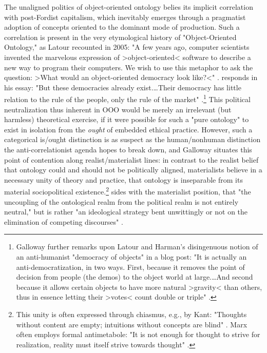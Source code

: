 The unaligned politics of object-oriented ontology belies its implicit correlation with post-Fordist capitalism, which inevitably emerges through a pragmatist adoption of concepts oriented to the dominant mode of production. Such a correlation is present in the very etymological history of "Object-Oriented Ontology," as Latour recounted in 2005: "A few years ago, computer scientists invented the marvelous expression of >object-oriented< software to describe a new way to program their computers. We wish to use this metaphor to ask the question: >What would an object-oriented democracy look like?<" \autocite[14--5]{Latour2005-vc}. \citeauthor{Galloway2013-ht} responds in his essay: "But these democracies already exist.…Their democracy has little relation to the rule of the people, only the rule of the market" \autocite[363]{Galloway2013-ht}.\footnote{
   Galloway further remarks upon Latour and Harman's disingenuous notion of an anti-humanist "democracy of objects" in a blog post: "It is actually an anti-democratization, in two ways. First, because it removes the point of decision from people (the demos) to the object world at large.…And second because it allows certain objects to have more natural >gravity< than others, thus in essence letting their >votes< count double or triple" \autocite{Galloway2012-da}.
  }
This political neutralization thus inherent in OOO would be merely an irrelevant (but harmless) theoretical exercise, if it were possible for such a "pure ontology" to exist in isolation from the \emph{ought} of embedded ethical practice. However, such a categorical is/ought distinction is as suspect as the human/nonhuman distinction the anti-correlationist agenda hopes to break down, and Galloway situates this point of contention along realist/materialist lines: in contrast to the realist belief that ontology could and should not be politically aligned, materialists believe in a necessary unity of theory and practice, that ontology is inseparable from its material sociopolitical existence.\footnote{
  This unity is often expressed through chiasmus, e.g., by Kant: "Thoughts without content are empty; intuitions without concepts are blind" \autocite*[86]{Kant2008-hh}. Marx often employs formal antimetabole: "It is not enough for thought to strive for realization, reality must itself strive towards thought" \autocite*[Introduction]{Marx1970-hw}.
}
\citeauthor{Galloway2013-ht} sides with the materialist position, that "the uncoupling of the ontological realm from the political realm is not entirely neutral," but is rather "an ideological strategy bent unwittingly or not on the elimination of competing discourses" \autocite[357]{Galloway2013-ht}.

